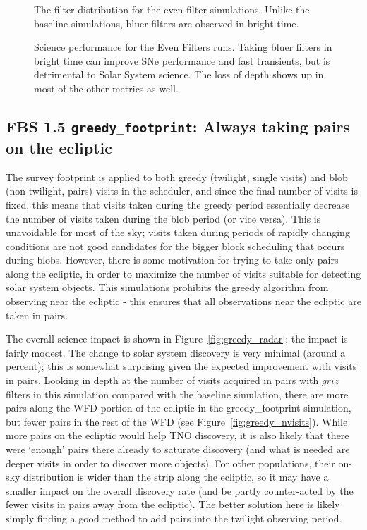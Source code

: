 \begin{figure}
\caption{The filter distribution for the even filter simulations. Unlike the baseline simulations, bluer filters are observed in bright time.}
\label{fig:even_filt_hourglass}
\end{figure}


\begin{figure}
\caption{Science performance for the Even Filters runs.  Taking bluer filters in bright time can improve SNe performance and fast transients, but is detrimental to Solar System science.  The loss of depth shows up in most of the other metrics as well.}
\label{fig:even_filt_radar}
\end{figure}


\subsection{FBS 1.5 {\tt greedy\_footprint}: Always taking pairs on the ecliptic}

The survey footprint is applied to both greedy (twilight, single visits) and blob (non-twilight, pairs) visits in the scheduler, and since the final number of visits is fixed, this means that visits taken during the greedy period essentially decrease the number of visits taken during the blob period (or vice versa). This is unavoidable for most of the sky; visits taken during periods of rapidly changing conditions are not good candidates for the bigger block scheduling that occurs during blobs. However, there is some motivation for trying to take only pairs along the ecliptic, in order to maximize the number of visits suitable for detecting solar system objects. This simulations prohibits the greedy algorithm from observing near the ecliptic - this ensures that all observations near the ecliptic are taken in pairs. 

The overall science impact is shown in Figure~\ref{fig:greedy_radar}; the impact is fairly modest. The change to solar system discovery is very minimal (around a percent); this is somewhat surprising given the expected improvement with visits in pairs. Looking in depth at the number of visits acquired in pairs with $griz$ filters in this simulation compared with the baseline simulation, there are more pairs along the WFD portion of the ecliptic in the greedy\_footprint simulation, but fewer pairs in the rest of the WFD (see Figure~\ref{fig:greedy_nvisits}). While more pairs on the ecliptic would help TNO discovery, it is also likely that there were `enough' pairs there already to saturate discovery (and what is needed are deeper visits in order to discover more objects). For other populations, their on-sky distribution is wider than the strip along the ecliptic, so it may have a smaller impact on the overall discovery rate (and be partly counter-acted by the fewer visits in pairs away from the ecliptic). The better solution here is likely simply finding a good method to add pairs into the twilight observing period. 

